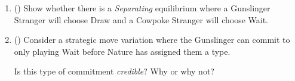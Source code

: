 \begin{question}[type=exam]{20}
\begin{enumerate}[label=\Alph*)]
    \item () 
    Show whether there is a \textit{Separating} equilibrium where a Gunslinger Stranger will choose Draw 
    and a Cowpoke Stranger will choose Wait.
    \vspace{3cm}

    \item ()
    Consider a strategic move variation where the Gunslinger can commit to only playing Wait 
    before Nature has assigned them a type. 

    Is this type of commitment \textit{credible}? Why or why not?

  \end{enumerate}
\end{question}
